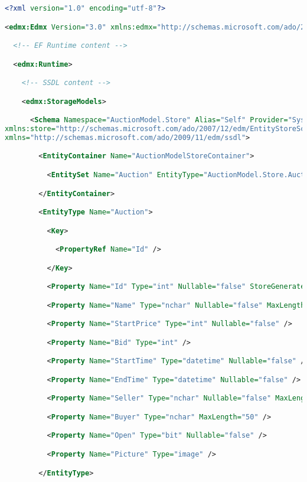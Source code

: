 \documentclass[a4paper,10pt]{scrreprt}
\begin{document}
\begin{lstlisting}[caption=sample edmx file,language=xml]
 <?xml version="1.0" encoding="utf-8"?>

<edmx:Edmx Version="3.0" xmlns:edmx="http://schemas.microsoft.com/ado/2009/11/edmx">

  <!-- EF Runtime content -->

  <edmx:Runtime>

    <!-- SSDL content -->

    <edmx:StorageModels>

      <Schema Namespace="AuctionModel.Store" Alias="Self" Provider="System.Data.SqlClient" ProviderManifestToken="2008" 
xmlns:store="http://schemas.microsoft.com/ado/2007/12/edm/EntityStoreSchemaGenerator" 
xmlns="http://schemas.microsoft.com/ado/2009/11/edm/ssdl">

        <EntityContainer Name="AuctionModelStoreContainer">

          <EntitySet Name="Auction" EntityType="AuctionModel.Store.Auction" store:Type="Tables" Schema="dbo" />

        </EntityContainer>

        <EntityType Name="Auction">

          <Key>

            <PropertyRef Name="Id" />

          </Key>

          <Property Name="Id" Type="int" Nullable="false" StoreGeneratedPattern="Identity" />

          <Property Name="Name" Type="nchar" Nullable="false" MaxLength="50" />

          <Property Name="StartPrice" Type="int" Nullable="false" />

          <Property Name="Bid" Type="int" />

          <Property Name="StartTime" Type="datetime" Nullable="false" />

          <Property Name="EndTime" Type="datetime" Nullable="false" />

          <Property Name="Seller" Type="nchar" Nullable="false" MaxLength="50" />

          <Property Name="Buyer" Type="nchar" MaxLength="50" />

          <Property Name="Open" Type="bit" Nullable="false" />

          <Property Name="Picture" Type="image" />

        </EntityType>


\end{lstlisting}
\end{document}

